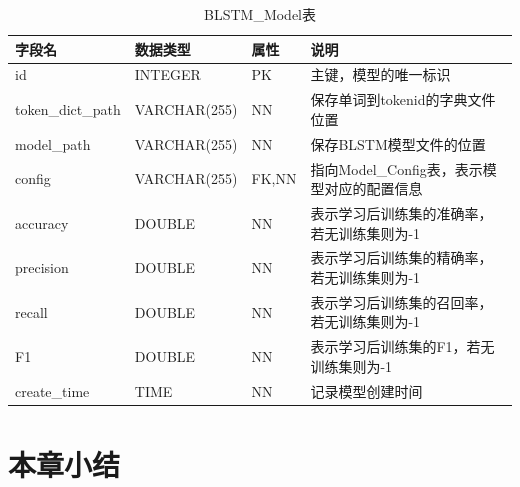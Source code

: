 \begin{table}[!htbp]\footnotesize %
	\centering
	\caption{BLSTM\_Model表}
	\vspace{2mm}
	\begin{tabular}{llll}
		\toprule
		\textbf{字段名}&\textbf{数据类型}&\textbf{属性}&\textbf{说明}\\
		\midrule
		id&INTEGER&PK&主键，模型的唯一标识\\
		token\_dict\_path &VARCHAR(255)&NN&保存单词到tokenid的字典文件位置\\
		model\_path		 &VARCHAR(255)&NN&保存BLSTM模型文件的位置\\
		config				 &VARCHAR(255)&FK,NN&指向Model\_Config表，表示模型对应的配置信息\\
		accuracy	&DOUBLE&NN&表示学习后训练集的准确率，若无训练集则为-1\\
		precision	&DOUBLE&NN&表示学习后训练集的精确率，若无训练集则为-1\\
		recall	&DOUBLE&NN&表示学习后训练集的召回率，若无训练集则为-1\\
		F1	&DOUBLE&NN&表示学习后训练集的F1，若无训练集则为-1\\
		create\_time		  &TIME&NN&记录模型创建时间\\
		\bottomrule
	\end{tabular}
	\label{sql:lstmModelTable}
\end{table}

\section{本章小结}
